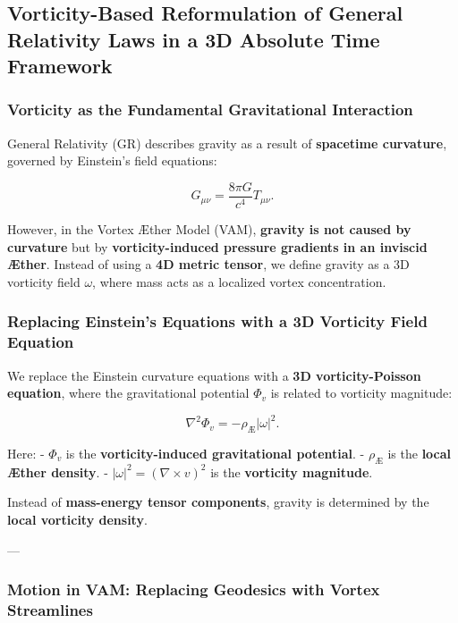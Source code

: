 
\subsection{Vorticity-Based Reformulation of General Relativity Laws in a 3D Absolute Time Framework}

\subsubsection*{Vorticity as the Fundamental Gravitational Interaction}

General Relativity (GR) describes gravity as a result of \textbf{spacetime curvature}, governed by Einstein's field equations:

\begin{equation*}
    G_{\mu\nu} = \frac{8\pi G}{c^4} T_{\mu\nu}.
\end{equation*}

However, in the Vortex Æther Model (VAM), \textbf{gravity is not caused by curvature} but by \textbf{vorticity-induced pressure gradients in an inviscid Æther}. Instead of using a \textbf{4D metric tensor}, we define gravity as a 3D vorticity field \( \omega \), where mass acts as a localized vortex concentration.

\subsubsection*{Replacing Einstein's Equations with a 3D Vorticity Field Equation}

We replace the Einstein curvature equations with a \textbf{3D vorticity-Poisson equation}, where the gravitational potential \( \Phi_v \) is related to vorticity magnitude:

\begin{equation*}
    \nabla^2 \Phi_v = - \rho_\text{Æ} |\omega|^2.
\end{equation*}

Here:
- \( \Phi_v \) is the \textbf{vorticity-induced gravitational potential}.
- \( \rho_\text{Æ} \) is the \textbf{local Æther density}.
- \( |\omega|^2 = (\nabla \times v)^2 \) is the \textbf{vorticity magnitude}.

Instead of \textbf{mass-energy tensor components}, gravity is determined by the \textbf{local vorticity density}.

---

\subsubsection*{Motion in VAM: Replacing Geodesics with Vortex Streamlines}


